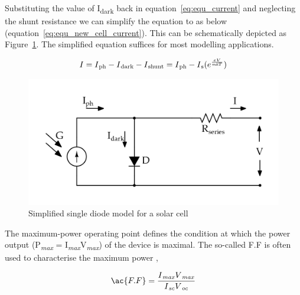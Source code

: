    Substituting the value of I\textsubscript{dark} back in equation~\ref{eq:equ_current} and neglecting the shunt resistance we can simplify the equation to as below (equation~\ref{eq:equ_new_cell_current}). This can be schematically depicted as Figure~\ref{fig:simple_EQu_cell}. The simplified equation suffices for most modelling applications.
   
    \begin{equation}
    \begin{aligned}
     I = I\textsubscript{ph} - I\textsubscript{dark} - I\textsubscript{shunt} = I\textsubscript{ph} -  I\textsubscript{s} (e^{\frac{eV}{\textit{mk}T}})
      \label{eq:equ_new_cell_current}
      \end{aligned}
      \end{equation}
  
     
 \begin{figure}[H]
   \begin{center}
   \includegraphics[width=\textwidth]{images/simplified_single_diode_model_simple}
   \caption{ Simplified single diode model for a solar cell }
   \label{fig:simple_EQu_cell}
   \end{center}
   \end{figure}

The maximum-power operating point defines the condition at which the power output (P\textsubscript{\textit{max}} = I\textsubscript{\textit{max}}V\textsubscript{\textit{max}}) of the device is maximal.
The so-called \ac{F.F} is often used to characterise the maximum power ,

\begin{equation}
 \begin{aligned}
  \ac{F.F} = \dfrac{I\textsubscript{\textit{max}}V\textsubscript{\textit{max}}}{I\textsubscript{\textit{sc}}V\textsubscript{\textit{oc}}}
   \label{eq:equ_current_new}
   \end{aligned}
   \end{equation}
   
